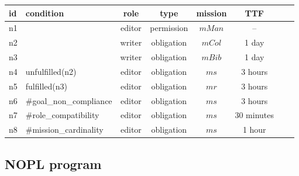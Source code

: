 \documentclass{article}
\newcommand{\pathwp}{../../examples/writePaper}
\theoremstyle{definition} \newtheorem{definition}{Definition}
\begin{document}
\begin{center}
   \begin{tabular}{l l c c c c c c}
      \toprule
      id & condition & role & type & mission & TTF \\
      \midrule
      n1 &  & editor  & permission & $mMan$ & -- \\
      n2 &  & writer  & obligation & $mCol$    & 1 day\\
      n3 &  & writer  & obligation & $mBib$    & 1 day\\
      n4 & unfulfilled(n2) & editor  & obligation & $ms$  & 3 hours\\
      n5 & fulfilled(n3)     & editor  & obligation & $mr$  & 3 hours\\
      n6 & \#goal\_non\_compliance & editor  & obligation & $ms$  & 3 hours\\
      n7 & \#role\_compatibility & editor  & obligation & $ms$  & 30 minutes\\
      n8 & \#mission\_cardinality & editor  & obligation & $ms$  & 1 hour\\
      \bottomrule
    \end{tabular}
\end{center}

\subsection{NOPL program}
{\small

}



\end{document}
